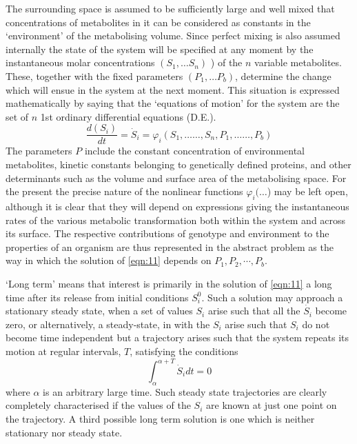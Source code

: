 The surrounding space is assumed to be sufficiently large and well mixed that concentrations of metabolites in it can be considered as constants in the `environment' of the metabolising volume. Since perfect mixing is also assumed internally the state of the system will be specified at any moment by the instantaneous molar concentrations $\left(S_{1}, \ldots S_{n}\right)$ ) of the $n$ variable metabolites. These, together with the fixed parameters $\left(P_{1}, \ldots P_{b}\right)$, determine the change which will ensue in the system at the next moment. This situation is expressed mathematically by saying that the `equations of motion' for the system are the set of $n$ 1st ordinary differential equations (D.E.).
%
\begin{equation}
\frac{d\left(S_{i}\right)}{d t} = \dot{S}_{i}=\varphi_{i}\left(S_{1}, \ldots \ldots, S_{n}, P_{1}, \ldots \ldots, P_{b}\right)
\label{eqn:11}
\end{equation}
%
The parameters $P$ include the constant concentration of environmental metabolites, kinetic constants belonging to genetically defined proteins, and other determinants such as the volume and surface area of the metabolising space. For the present the precise nature of the nonlinear functions $\varphi_{i}(\ldots$) may be left open, although it is clear that they will depend on expressions giving the instantaneous rates of the various metabolic transformation both within the system and across its surface. The respective contributions of genotype and environment to the properties of an organism are thus represented in the abstract problem as the way in which the solution of \eqref{eqn:11} depends on $P_{1}, P_{2}, \cdots, P_{b}$.

`Long term' means that interest is primarily in the solution of \eqref{eqn:11} a long time after its release from initial conditions $S_{i}^{0}$. Such a solution may approach a stationary steady state, when a set of values $S_i$ arise such that all the $\dot{S_i}$ become zero, or alternatively, a steady-state, in with the $S_{i}$ arise such that $S_{i}$ do not become time independent but a trajectory arises such that the system repeats its motion at regular intervals, $T$, satisfying the conditions
%
$$ \int_\alpha^{\alpha + T} \dot{S}_i dt = 0 $$
%
where $\alpha$ is an arbitrary large time. Such steady state trajectories are clearly completely characterised if the values of the $S_{i}$ are known at just one point on the trajectory. A third possible long term solution is one which is neither stationary nor steady state.

